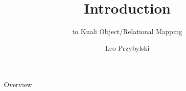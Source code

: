 \documentclass[xcolor=dvipsnames,14pt]{beamer}
\begin{document}
\title{Introduction}
\subtitle{to Kuali Object/Relational Mapping}
\author[Leo]{Leo Przybylski}

\begin{frame}[plain]
  \titlepage
\end{frame}

\begin{frame}{Overview}
\end{frame}
\end{document}
